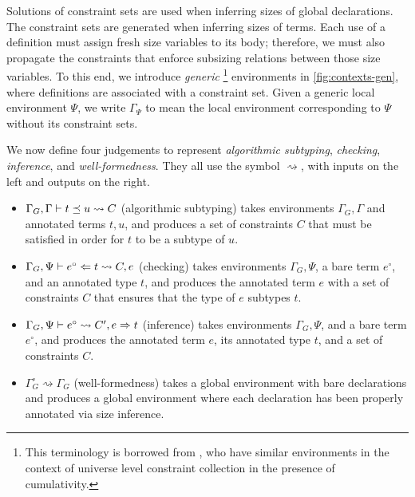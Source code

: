 Solutions of constraint sets are used when inferring sizes of global declarations.
The constraint sets are generated when inferring sizes of terms.
Each use of a definition must assign fresh size variables to its body; therefore, we must also propagate the constraints that enforce subsizing relations between those size variables.
To this end, we introduce \emph{generic}%
\footnote{This terminology is borrowed from \citet{universes}, who have similar environments in the context of universe level constraint collection in the presence of cumulativity.}
environments in \autoref{fig:contexts-gen}, where definitions are associated with a constraint set.
Given a generic local environment $\Psi$, we write $\Gamma_{\Psi}$ to mean the local environment corresponding to $\Psi$ without its constraint sets.

We now define four judgements to represent \emph{algorithmic subtyping}, \emph{checking}, \emph{inference}, and \emph{well-formed\-ness}.
They all use the symbol $\rightsquigarrow$, with inputs on the left and outputs on the right.
\begin{itemize}
  \item $\Gamma_G, \Gamma \vdash t \preceq u \rightsquigarrow C$ (algorithmic subtyping) takes environments $\Gamma_G, \Gamma$ and annotated terms $t, u$, and produces a set of constraints $C$ that must be satisfied in order for $t$ to be a subtype of $u$.
  \item $\Gamma_G, \Psi \vdash e^\circ \Leftarrow t \rightsquigarrow C, e$ (checking) takes environments $\Gamma_G, \Psi$, a bare term $e^\circ$, and an annotated type $t$, and produces the annotated term $e$ with a set of constraints $C$ that ensures that the type of $e$ subtypes $t$.
  \item $\Gamma_G, \Psi \vdash e^\circ \rightsquigarrow C', e \Rightarrow t$ (inference) takes environments $\Gamma_G, \Psi$, and a bare term $e^\circ$, and produces the annotated term $e$, its annotated type $t$, and a set of constraints $C$.
  \item $\Gamma_G^\circ \rightsquigarrow \Gamma_G$ (well-formedness) takes a global environment with bare declarations and produces a global environment where each declaration has been properly annotated via size inference.
\end{itemize}

